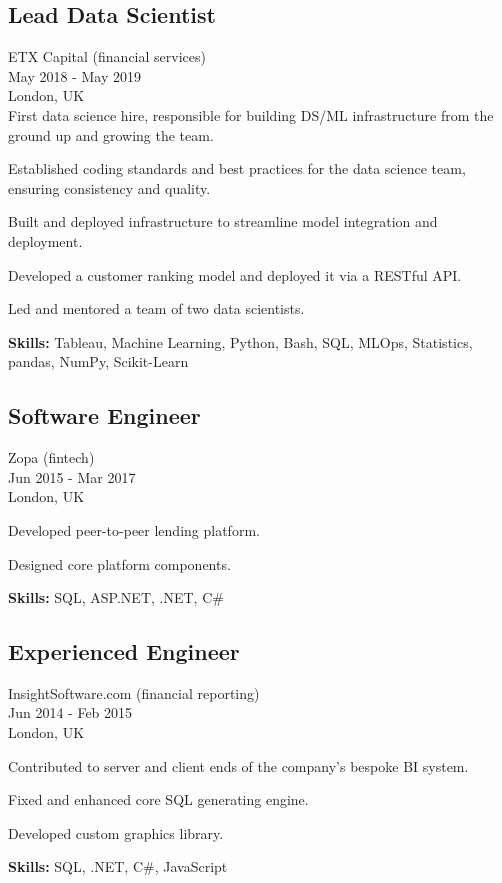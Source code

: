 \documentclass[a4paper,10pt]{article}
\begin{document}
\subsection*{Lead Data Scientist}
ETX Capital (financial services) \\
May 2018 - May 2019 \\
London, UK \\
First data science hire, responsible for building DS/ML infrastructure from the ground up and growing the team.
\begin{bulletlist}
    \item Established coding standards and best practices for the data science team, ensuring consistency and quality.
    \item Built and deployed infrastructure to streamline model integration and deployment.
    \item Developed a customer ranking model and deployed it via a RESTful API.
    \item Led and mentored a team of two data scientists.
\end{bulletlist}
\textbf{Skills: }Tableau, Machine Learning, Python, Bash, SQL, MLOps, Statistics, pandas, NumPy, Scikit-Learn

\pagebreak

\subsection*{Software Engineer}
Zopa (fintech) \\
Jun 2015 - Mar 2017 \\
London, UK
\begin{bulletlist}
    \item Developed peer-to-peer lending platform.
    \item Designed core platform components.
\end{bulletlist}
\textbf{Skills:} SQL, ASP.NET, .NET, C\#

\subsection*{Experienced Engineer}
InsightSoftware.com (financial reporting) \\
Jun 2014 - Feb 2015 \\
London, UK
\begin{bulletlist}
    \item Contributed to server and client ends of the company's bespoke BI system.
    \item Fixed and enhanced core SQL generating engine.
    \item Developed custom graphics library.
\end{bulletlist}
\textbf{Skills:} SQL, .NET, C\#, JavaScript
\end{document}
